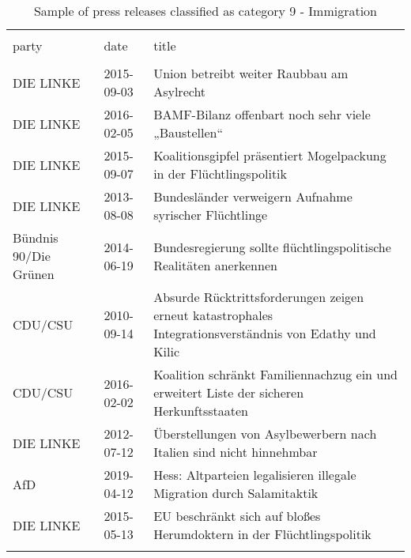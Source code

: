 
\begin{table}[!htbp] \centering 
  \caption{Sample of press releases classified as category 9 - Immigration} 
  \label{tab:7-document-samples} 
\begin{tabularx}{\textwidth}{ssX} 
\\[-1.8ex]\hline 
\hline \\[-1.8ex] 
party & date & title \\ 
\hline \\[-1.8ex] 
DIE LINKE & 2015-09-03 & Union betreibt weiter Raubbau am Asylrecht  \\ 
DIE LINKE & 2016-02-05 & BAMF-Bilanz offenbart noch sehr viele „Baustellen“ \\ 
DIE LINKE & 2015-09-07 & Koalitionsgipfel präsentiert Mogelpackung in der Flüchtlingspolitik  \\ 
DIE LINKE & 2013-08-08 & Bundesländer verweigern Aufnahme syrischer Flüchtlinge \\ 
Bündnis 90/Die Grünen & 2014-06-19 & Bundesregierung sollte flüchtlingspolitische Realitäten anerkennen \\ 
CDU/CSU & 2010-09-14 & Absurde Rücktrittsforderungen zeigen erneut katastrophales Integrationsverständnis von Edathy und Kilic \\ 
CDU/CSU & 2016-02-02 & Koalition schränkt Familiennachzug ein und erweitert Liste der sicheren Herkunftsstaaten \\ 
DIE LINKE & 2012-07-12 & Überstellungen von Asylbewerbern nach Italien sind nicht hinnehmbar  \\ 
AfD & 2019-04-12 & Hess: Altparteien legalisieren illegale Migration durch Salamitaktik \\ 
DIE LINKE & 2015-05-13 & EU beschränkt sich auf bloßes Herumdoktern in der Flüchtlingspolitik \\ 
\hline \\[-1.8ex] 
\end{tabularx} 
\end{table} 
